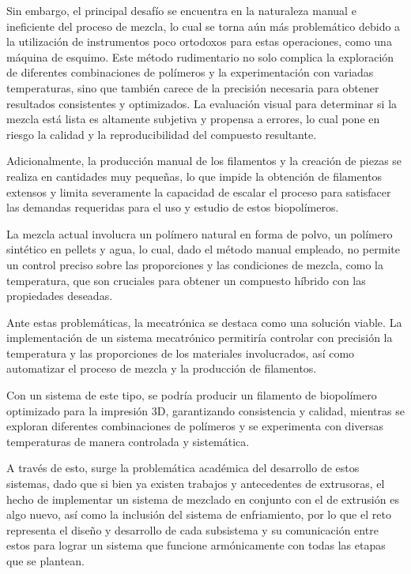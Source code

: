 \documentclass[14pt,oneside]{extarticle} %
\begin{document}
Sin embargo, el principal desafío se encuentra en la naturaleza manual e ineficiente del proceso de mezcla, lo cual se torna aún más problemático debido a la utilización de instrumentos poco ortodoxos para estas operaciones, como una máquina de esquimo. Este método rudimentario no solo complica la exploración de diferentes combinaciones de polímeros y la experimentación con variadas temperaturas, sino que también carece de la precisión necesaria para obtener resultados consistentes y optimizados. La evaluación visual para determinar si la mezcla está lista es altamente subjetiva y propensa a errores, lo cual pone en riesgo la calidad y la reproducibilidad del compuesto resultante.

Adicionalmente, la producción manual de los filamentos y la creación de piezas se realiza en cantidades muy pequeñas, lo que impide la obtención de filamentos extensos y limita severamente la capacidad de escalar el proceso para satisfacer las demandas requeridas para el uso y estudio de estos biopolímeros.

La mezcla actual involucra un polímero natural en forma de polvo, un polímero sintético en pellets y agua, lo cual, dado el método manual empleado, no permite un control preciso sobre las proporciones y las condiciones de mezcla, como la temperatura, que son cruciales para obtener un compuesto híbrido con las propiedades deseadas.

Ante estas problemáticas, la mecatrónica se destaca como una solución viable. La implementación de un sistema mecatrónico permitiría controlar con precisión la temperatura y las proporciones de los materiales involucrados, así como automatizar el proceso de mezcla y la producción de filamentos. 

\newpage
Con un sistema de este tipo, se podría producir un filamento de biopolímero optimizado para la impresión 3D, garantizando consistencia y calidad, mientras se exploran diferentes combinaciones de polímeros y se experimenta con diversas temperaturas de manera controlada y sistemática.

A través de esto, surge la problemática académica del desarrollo de estos sistemas, dado que si bien ya existen trabajos y antecedentes de extrusoras, el hecho de implementar un sistema de mezclado en conjunto con el de extrusión es algo nuevo, así como la inclusión del sistema de enfriamiento, por lo que el reto representa el diseño y desarrollo de cada subsistema y su comunicación entre estos para lograr un sistema que funcione armónicamente con todas las etapas que se plantean.
\end{document}
